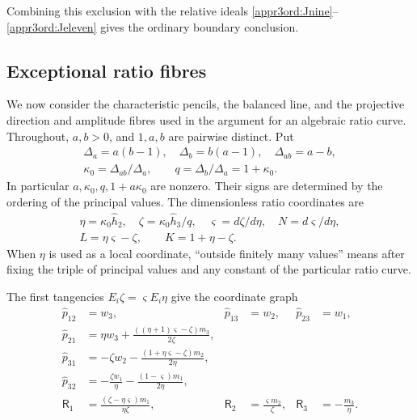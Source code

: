 \documentclass[11pt,a4paper]{article}
\numberwithin{equation}{section}
\theoremstyle{plain}
\theoremstyle{definition}
\theoremstyle{remark}
\begin{document}
Combining this exclusion with the relative ideals
\eqref{appr3ord:Jnine}--\eqref{appr3ord:Jeleven} gives the ordinary
boundary conclusion.

\subsection{Exceptional ratio fibres}
\label{appr3fib:scope}

We now consider the characteristic pencils, the balanced line, and the projective direction
and amplitude fibres used in the argument for an algebraic ratio curve.  Throughout,
\(a,b>0\), and \(1,a,b\) are pairwise distinct.  Put
\[
 \begin{gathered}
 \Delta_a=a(b-1),\quad \Delta_b=b(a-1),\quad \Delta_{ab}=a-b,\\
 \kappa_0 =\Delta_{ab}/\Delta_a,\qquad q=\Delta_b/\Delta_a=1+\kappa_0 .
 \end{gathered}
\]
In particular \(a,\kappa_0 ,q,1+a\kappa_0 \) are nonzero.  Their signs are determined by the ordering of the principal values.
The dimensionless ratio coordinates are
\[
 \begin{gathered}
 \eta =\kappa_0 \widehat h_2 ,\quad \zeta =\kappa_0 \widehat h_3 /q,\quad \varsigma =d\zeta /d\eta ,\quad N=d\varsigma /d\eta ,\\
 L=\eta \varsigma -\zeta ,\qquad K=1+\eta -\zeta .
 \end{gathered}
\]
When \(\eta \) is used as a local coordinate, ``outside finitely many values''
means after fixing the triple of principal values and any constant of the particular
ratio curve.  

The first tangencies $E_i\zeta =\varsigma  E_i\eta $ give the coordinate graph
\begin{equation}\label{r3:directioncoordinates}
\begin{aligned}
 \widehat p_{12}&=w_3,&\widehat p_{13}&=w_2,&\widehat p_{23}&=w_1,\\
 \widehat p_{21}&=\eta w_3+\frac{((\eta +1)\varsigma -\zeta )m_3}{2\zeta },\\
 \widehat p_{31}&=-\zeta w_2-\frac{(1+\eta \varsigma -\zeta )m_2}{2\eta },\\
 \widehat p_{32}&=-\frac{\zeta w_1}{\eta }-\frac{(1-\varsigma )m_1}{2\eta },\\
 \mathsf R_1&=\frac{(\zeta -\eta \varsigma )m_1}{\eta \zeta },&
 \mathsf R_2&=\frac{\varsigma m_2}{\zeta },&\mathsf R_3&=-\frac{m_3}{\eta }.
\end{aligned}
\end{equation}
\end{document}
